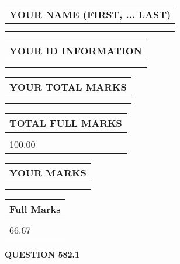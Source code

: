 \documentclass{ctexart}
\begin{document}
   
   
   
\newpage 
\setcounter{page}{ 
   582001 } 
   
   
   
   
\noindent\begin{tabular}{|l|}
\hline
YOUR NAME (FIRST, ... LAST)  \\
\hline
 \\ 
 \\ 
\hline
\end{tabular}
\hspace{0.05in} \begin{tabular}{|l|}
\hline
 YOUR   ID   INFORMATION  \\
\hline
 \\ 
 \\ 
\hline
\end{tabular}
   
   
\vspace{0.2in}\noindent\begin{tabular}{|l|}
\hline
YOUR TOTAL MARKS  \\
\hline
 \\ 
 \\ 
\hline
\end{tabular}
\hspace{0.05in} \begin{tabular}{|l|}
\hline
TOTAL FULL MARKS  \\
\hline
 \\ 
100.00 \\
\hline
\end{tabular}
   
   
 \vspace{0.2in}
 
 
 
 
   
   
  
\vspace{0.2in}
  
\noindent\begin{tabular}{|l|}
\hline
 YOUR MARKS  \\
\hline
 \\ 
 \\ 
\hline
\end{tabular}
\hspace{0.05in} \begin{tabular}{|l|}
\hline
 Full Marks  \\
\hline
 \\ 
66.67 \\
\hline
\end{tabular}
{\textbf{\Large{QUESTION
582.1 
}}}
  
\end{document}
